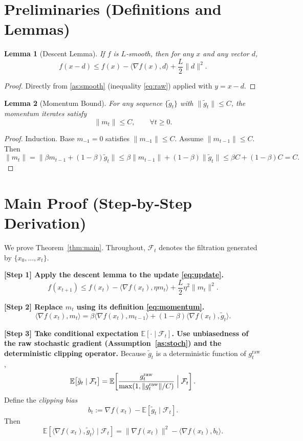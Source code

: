 \documentclass{article}
\newtheorem{lemma}{Lemma}
\begin{document}
\newpage
\section*{Preliminaries (Definitions and Lemmas)}
\begin{lemma}[Descent Lemma]\label{lem:descent}
If $f$ is $L$‑smooth, then for any $x$ and any vector $d$,
\[
f(x-d)\le f(x)-\langle\nabla f(x),d\rangle+\frac{L}{2}\|d\|^2 .
\tag{2}
\]
\end{lemma}
\begin{proof}
Directly from \ref{as:smooth} (inequality \eqref{eq:raw}) applied with $y=x-d$.
\end{proof}

\begin{lemma}[Momentum Bound]\label{lem:momentum}
For any sequence $\{\tilde g_t\}$ with $\|\tilde g_t\|\le C$, the momentum iterates satisfy
\[
\|m_t\|\le C,\qquad\forall t\ge0.
\tag{3}
\]
\end{lemma}
\begin{proof}
Induction. Base $m_{-1}=0$ satisfies $\|m_{-1}\|\le C$. Assume $\|m_{t-1}\|\le C$.
Then
\[
\|m_t\| =\|\beta m_{t-1}+(1-\beta)\tilde g_t\|
\le \beta\|m_{t-1}\|+(1-\beta)\|\tilde g_t\|
\le \beta C+(1-\beta)C=C.
\]
\end{proof}

\section*{Main Proof (Step‑by‑Step Derivation)}
We prove Theorem~\ref{thm:main}. Throughout, $\mathcal{F}_t$ denotes the filtration generated by $\{x_0,\dots,x_t\}$.

\noindent\textbf{[Step 1] Apply the descent lemma to the update \eqref{eq:update}.}
\[
f(x_{t+1})\le f(x_t)-\langle\nabla f(x_t),\eta m_t\rangle
      +\frac{L}{2}\eta^2\|m_t\|^2 .
\tag{4}
\]

\noindent\textbf{[Step 2] Replace $m_t$ using its definition \eqref{eq:momentum}.}
\[
\langle\nabla f(x_t),m_t\rangle
= \beta\langle\nabla f(x_t),m_{t-1}\rangle
  +(1-\beta)\langle\nabla f(x_t),\tilde g_t\rangle .
\tag{5}
\]

\noindent\textbf{[Step 3] Take conditional expectation $\mathbb{E}[\cdot\mid\mathcal{F}_t]$.
Use unbiasedness of the raw stochastic gradient (Assumption~\ref{as:stoch}) and the deterministic clipping operator.}
Because $\tilde g_t$ is a deterministic function of $g_t^{\text{raw}}$,
\[
\mathbb{E}\bigl[\tilde g_t\mid\mathcal{F}_t\bigr]
= \mathbb{E}\!\left[\frac{g_t^{\text{raw}}}{\max(1,\|g_t^{\text{raw}}\|/C)}\Bigm|\mathcal{F}_t\right].
\]
Define the \emph{clipping bias} 
\[
b_t:=\nabla f(x_t)-\mathbb{E}[\tilde g_t\mid\mathcal{F}_t].
\tag{6}
\]
Then
\[
\mathbb{E}[\langle\nabla f(x_t),\tilde g_t\rangle\mid\mathcal{F}_t]
= \|\nabla f(x_t)\|^2-\langle\nabla f(x_t),b_t\rangle .
\tag{7}
\]
\end{document}
